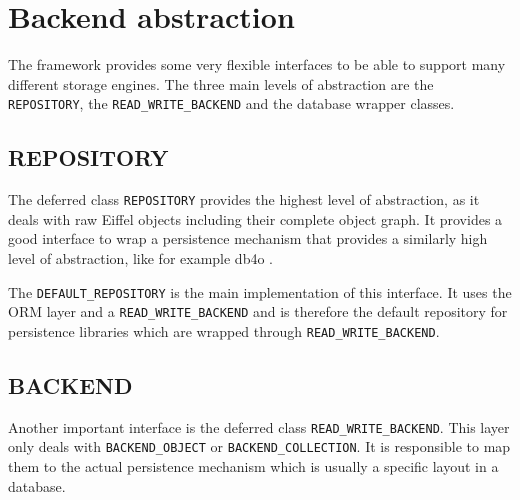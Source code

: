 \documentclass[a4paper,12pt]{report}
\begin{document}
% 
% 

\chapter{Backend abstraction}

The framework provides some very flexible interfaces to be able to support many different storage engines. 
The three main levels of abstraction are the \lstinline!REPOSITORY!, the \lstinline!READ_WRITE_BACKEND! and the database wrapper classes.

\section{REPOSITORY}

The deferred class \lstinline!REPOSITORY! provides the highest level of abstraction, as it deals with raw Eiffel objects including their complete object graph.
It provides a good interface to wrap a persistence mechanism that provides a similarly high level of abstraction, like for example db4o \cite{db4o}.

The \lstinline!DEFAULT_REPOSITORY! is the main implementation of this interface.
It uses the ORM layer and a \lstinline!READ_WRITE_BACKEND! and is therefore the default repository for persistence libraries which are wrapped through \lstinline!READ_WRITE_BACKEND!.

\section{BACKEND}

Another important interface is the deferred class \lstinline!READ_WRITE_BACKEND!.
This layer only deals with \lstinline!BACKEND_OBJECT! or \lstinline!BACKEND_COLLECTION!.
It is responsible to map them to the actual persistence mechanism which is usually a specific layout in a database.
\end{document}
